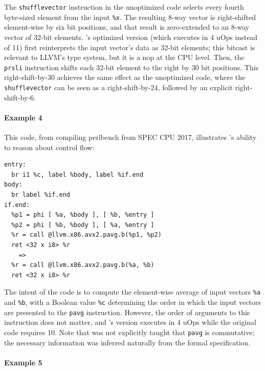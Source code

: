 The \texttt{shufflevector} instruction in the unoptimized code selects
every fourth byte-sized element from the input \texttt{\%x}.
%
The resulting 8-way vector is right-shifted element-wise by six bit
positions, and that result is zero-extended to an 8-way vector of
32-bit elements.
%
\minotaur's optimized version (which executes in 4 uOps instead of 11)
first reinterprets the input vector's data as 32-bit elements; this
bitcast is relevant to LLVM's type system, but it is a nop at the CPU
level.
%
Then, the \texttt{prsli} instruction shifts each 32-bit element to the
right by 30 bit positions.
%
This right-shift-by-30 achieves the same effect as the unoptimized
code, where the \texttt{shufflevector} can be seen as a
right-shift-by-24, followed by an explicit right-shift-by-6.

\paragraph*{Example 4}

This code, from compiling perlbench from SPEC CPU 2017, illustrates
\minotaur's ability to reason about control flow:

{\begin{quoting}\begin{Verbatim}
entry:
  br i1 %c, label %body, label %if.end
body:
  br label %if.end
if.end:
  %p1 = phi [ %a, %body ], [ %b, %entry ]
  %p2 = phi [ %b, %body ], [ %a, %entry ]
  %r = call @llvm.x86.avx2.pavg.b(%p1, %p2)
  ret <32 x i8> %r
    =>
  %r = call @llvm.x86.avx2.pavg.b(%a, %b)
  ret <32 x i8> %r
\end{Verbatim}
\end{quoting}}

The intent of the code is to compute the element-wise average of input
vectors \texttt{\%a} and \texttt{\%b}, with a Boolean value
\texttt{\%c} determining the order in which the input vectors are
presented to the \texttt{pavg} instruction.
%
However, the order of arguments to this instruction does not matter, and
\minotaur's version executes in 4 uOps while the original code requires
10.
%
Note that \minotaur{} was not explicitly taught that \texttt{pavg} is
commutative; the necessary information was inferred naturally from the
formal specification.


\paragraph*{Example 5}

